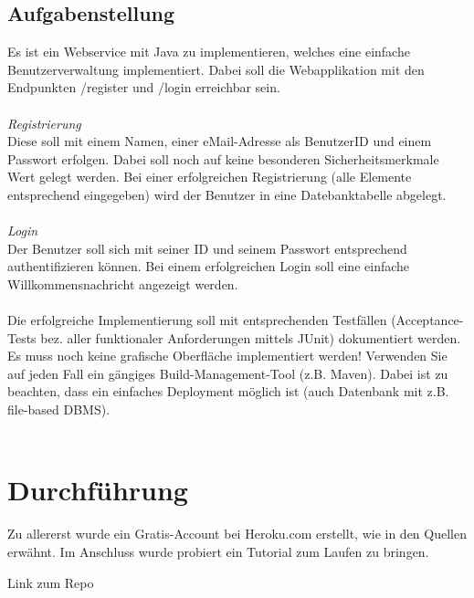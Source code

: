 \documentclass[letterpaper, 12pt]{article}
\let\tempsection\section
\renewcommand\section[1]{\vspace{-0.3cm}\tempsection{#1}\vspace{-0.3cm}}
\let\tempsubsection\subsection
\renewcommand\subsection[1]{\vspace{0cm}\tempsubsection{#1}\vspace{0cm}}
\begin{document}
\subsection{Aufgabenstellung}
Es ist ein Webservice mit Java zu implementieren, welches eine einfache Benutzerverwaltung implementiert. Dabei soll die Webapplikation mit den Endpunkten /register und /login erreichbar sein. \\ \\
\textit{Registrierung} \\
Diese soll mit einem Namen, einer eMail-Adresse als BenutzerID und einem Passwort erfolgen. Dabei soll noch auf keine besonderen Sicherheitsmerkmale Wert gelegt werden. Bei einer erfolgreichen Registrierung (alle Elemente entsprechend eingegeben) wird der Benutzer in eine Datebanktabelle abgelegt. \\ \\
\textit{Login} \\
Der Benutzer soll sich mit seiner ID und seinem Passwort entsprechend authentifizieren können. Bei einem erfolgreichen Login soll eine einfache Willkommensnachricht angezeigt werden. \\ \\
Die erfolgreiche Implementierung soll mit entsprechenden Testfällen (Acceptance-Tests bez. aller funktionaler Anforderungen mittels JUnit) dokumentiert werden. Es muss noch keine grafische Oberfläche implementiert werden! Verwenden Sie auf jeden Fall ein gängiges Build-Management-Tool (z.B. Maven). Dabei ist zu beachten, dass ein einfaches Deployment möglich ist (auch Datenbank mit z.B. file-based DBMS). \\ \\
\cite{eins} \cite{zwei} \cite{drei} \cite{vier}

\newpage

\section{Durchführung}

Zu allererst wurde ein Gratis-Account bei Heroku.com erstellt, wie in den Quellen erwähnt. Im Anschluss wurde probiert ein Tutorial zum Laufen zu bringen.

Link zum Repo \cite{repo}

\newpage



\lstlistoflistings
\listoffigures
\end{document}
